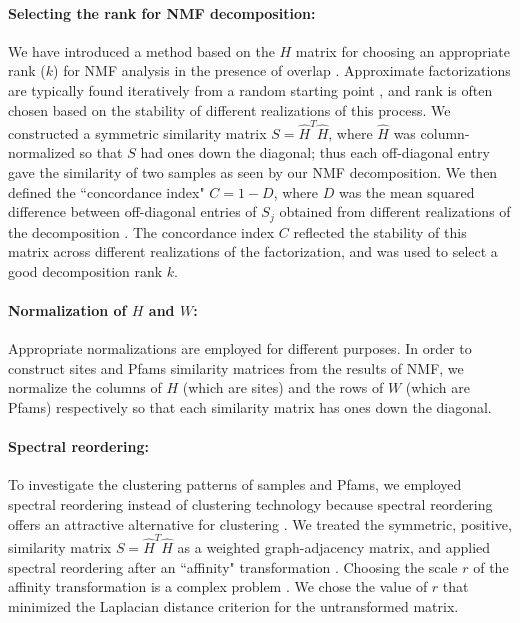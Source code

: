 \paragraph{Selecting the rank for NMF decomposition:} We have introduced a method based on the $H$ matrix for choosing an appropriate rank ($k$) for NMF analysis in the presence of overlap \cite{jiang_non-negative_2012}. Approximate factorizations are typically found iteratively from a random starting point \cite{lee_learning_1999}, and rank is often chosen based on the stability of different realizations of this process. We constructed a symmetric similarity matrix $S = {\hat H}^T \hat H$, where $\hat H$ was column-normalized so that $S$ had ones down the diagonal; thus each off-diagonal entry gave the similarity of two samples as seen by our NMF decomposition. We then defined the ``concordance index" $C = 1-D$, where $D$ was the mean squared difference between off-diagonal entries of $S_j$ obtained from different realizations of the decomposition \cite{jiang_non-negative_2012}. The concordance index $C$ reflected the stability of this matrix across different realizations of the factorization, and was used to select a good decomposition rank $k$. 

\paragraph{Normalization of $H$ and $W$:} Appropriate normalizations are employed for different purposes. In order to construct sites and Pfams similarity matrices from the results of NMF, we normalize the columns of $H$ (which are sites) and the rows of $W$  (which are Pfams) respectively so that each similarity matrix has ones down the diagonal. 

\paragraph{Spectral reordering:} To investigate the clustering patterns of samples and Pfams, we employed spectral reordering instead of clustering technology because spectral reordering offers an attractive alternative for clustering \cite{maetschke_visual_2010}. We treated the symmetric, positive, similarity matrix $S = {\hat H}^T \hat H$ as a weighted graph-adjacency matrix, and applied spectral reordering after an ``affinity" transformation \cite{maetschke_visual_2010}. Choosing the scale $r$ of the affinity transformation is a complex problem \cite{zelnik2004self, alzate_multiway_2010}. We chose the value of $r$ that minimized the Laplacian distance criterion for the untransformed matrix.

